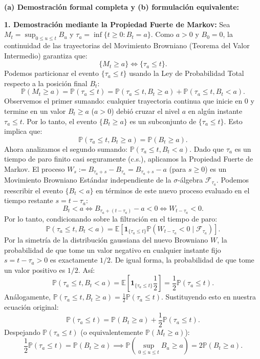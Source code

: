 \documentclass[11pt, letterpaper]{article}
\begin{document}
\begin{solucion}
    \vspace{3mm}
    \textbf{(a) Demostración formal completa y (b) formulación equivalente:}

    \textbf{1. Demostración mediante la Propiedad Fuerte de Markov:}
    Sea $M_t = \sup_{0 \le u \le t} B_u$ y $\tau_a = \inf\{t \ge 0 : B_t = a\}$. 
    Como $a > 0$ y $B_0 = 0$, la continuidad de las trayectorias del Movimiento Browniano (Teorema del Valor Intermedio) garantiza que:
    \[ \{M_t \ge a\} \iff \{\tau_a \le t\}. \]
    Podemos particionar el evento $\{\tau_a \le t\}$ usando la Ley de Probabilidad Total respecto a la posición final $B_t$:
    \[ \mathbb{P}(M_t \ge a) = \mathbb{P}(\tau_a \le t) = \mathbb{P}(\tau_a \le t, B_t \ge a) + \mathbb{P}(\tau_a \le t, B_t < a). \]
    Observemos el primer sumando: cualquier trayectoria continua que inicie en $0$ y termine en un valor $B_t \ge a$ ($a>0$) debió cruzar el nivel $a$ en algún instante $\tau_a \le t$. Por lo tanto, el evento $\{B_t \ge a\}$ es un subconjunto de $\{\tau_a \le t\}$. Esto implica que:
    \[ \mathbb{P}(\tau_a \le t, B_t \ge a) = \mathbb{P}(B_t \ge a). \]
    Ahora analizamos el segundo sumando: $\mathbb{P}(\tau_a \le t, B_t < a)$.
    Dado que $\tau_a$ es un tiempo de paro finito casi seguramente (c.s.), aplicamos la Propiedad Fuerte de Markov. El proceso $W_s := B_{\tau_a + s} - B_{\tau_a} = B_{\tau_a + s} - a$ (para $s \ge 0$) es un Movimiento Browniano Estándar independiente de la $\sigma$-álgebra $\mathcal{F}_{\tau_a}$.
    Podemos reescribir el evento $\{B_t < a\}$ en términos de este nuevo proceso evaluado en el tiempo restante $s = t - \tau_a$:
    \[ B_t < a \iff B_{\tau_a + (t - \tau_a)} - a < 0 \iff W_{t - \tau_a} < 0. \]
    Por lo tanto, condicionando sobre la filtración en el tiempo de paro:
    \[ \mathbb{P}(\tau_a \le t, B_t < a) = \mathbb{E}\left[ \mathbf{1}_{\{\tau_a \le t\}} \mathbb{P}(W_{t - \tau_a} < 0 \mid \mathcal{F}_{\tau_a}) \right]. \]
    Por la simetría de la distribución gaussiana del nuevo Browniano $W$, la probabilidad de que tome un valor negativo en cualquier instante fijo $s = t - \tau_a > 0$ es exactamente $1/2$. De igual forma, la probabilidad de que tome un valor positivo es $1/2$. Así:
    \[ \mathbb{P}(\tau_a \le t, B_t < a) = \mathbb{E}\left[ \mathbf{1}_{\{\tau_a \le t\}} \frac{1}{2} \right] = \frac{1}{2} \mathbb{P}(\tau_a \le t). \]
    Análogamente, $\mathbb{P}(\tau_a \le t, B_t \ge a) = \frac{1}{2} \mathbb{P}(\tau_a \le t)$.
    Sustituyendo esto en nuestra ecuación original:
    \[ \mathbb{P}(\tau_a \le t) = \mathbb{P}(B_t \ge a) + \frac{1}{2}\mathbb{P}(\tau_a \le t). \]
    Despejando $\mathbb{P}(\tau_a \le t)$ (o equivalentemente $\mathbb{P}(M_t \ge a)$):
    \[ \frac{1}{2}\mathbb{P}(\tau_a \le t) = \mathbb{P}(B_t \ge a) \implies \mathbb{P}\left( \sup_{0 \le u \le t} B_u \ge a \right) = 2\mathbb{P}(B_t \ge a). \]


\end{solucion}
\end{document}
